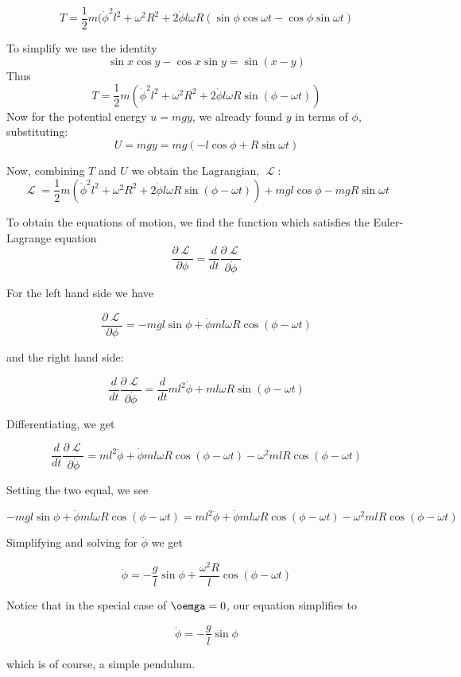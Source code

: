 \documentclass{article}
\DeclareMathOperator{\Lagr}{\mathcal{L}}
\begin{document}
$$
T = \frac{1}{2}m(\dot{\phi}^2l^2+\omega^2R^2+2\dot{\phi}l\omega R(\sin\phi\cos\omega t- \cos\phi\sin\omega t)
$$

To simplify we use the identity 
$$
\sin x\cos y - \cos x \sin y = \sin(x - y)
$$
Thus
$$
T = \frac{1}{2}m(\dot{\phi}^2l^2+\omega^2R^2+2\dot{\phi}l\omega R\sin(\phi - \omega t))
$$
Now for the potential energy $u = mgy$, we already found $y$ in terms of $\phi$, substituting:
$$
U = mgy = mg(-l\cos\phi + R\sin\omega t)
$$

Now, combining $T$ and $U$ we obtain the Lagrangian, $\Lagr$:
$$
\Lagr = \frac{1}{2}m(\dot{\phi}^2l^2+\omega^2R^2+2\dot{\phi}l\omega R\sin(\phi - \omega t)) + mgl\cos\phi - mgR\sin\omega t
$$

To obtain the equations of motion, we find the function which satisfies the Euler-Lagrange equation
$$
\frac{\partial \Lagr}{\partial \phi} = \frac{d}{dt}\frac{\partial \Lagr}{\partial \dot{\phi}}
$$

For the left hand side we have

$$
\frac{\partial \Lagr}{\partial \phi} = -mgl\sin\phi + \dot{\phi}ml\omega R\cos(\phi-\omega t)
$$

and the right hand side:

$$
\frac{d}{dt}\frac{\partial \Lagr}{\partial \dot{\phi}} = \frac{d}{dt} ml^2 \dot{\phi} + ml\omega R\sin(\phi - \omega t)
$$

Differentiating, we get

$$
\frac{d}{dt}\frac{\partial \Lagr}{\partial \dot{\phi}} = ml^2 \ddot{\phi} + \dot{\phi}ml\omega R\cos(\phi - \omega t) -  \omega^2 mlR\cos(\phi - \omega t)
$$

Setting the two equal, we see

$$
-mgl\sin\phi + \dot{\phi}ml\omega R\cos(\phi-\omega t) = ml^2 \ddot{\phi} + \dot{\phi}ml\omega R\cos(\phi - \omega t) -  \omega^2 mlR\cos(\phi - \omega t)
$$

Simplifying and solving for $\ddot{\phi}$ we get

$$
\ddot{\phi} = -\frac{g}{l}\sin\phi + \frac{\omega^2R}{l}\cos(\phi - \omega t)
$$

Notice that in the special case of $\oemga = 0$, our equation simplifies to 

$$
\ddot{\phi} = -\frac{g}{l}\sin\phi
$$

which is of course, a simple pendulum.
\end{document}
